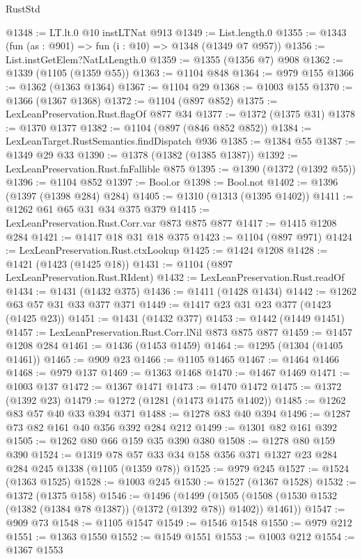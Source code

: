 \begin{lexlean}{RustStd}
\begin{coremodule}
{\begin{coremodule}
{{{{{{{{{@1348 := LT.lt.{0} @10 instLTNat @913
@1349 := List.length.{0}
@1355 := @1343 (fun (as : @901) => fun (i : @10) => @1348 (@1349 @7 @957))
@1356 := List.instGetElem?NatLtLength.{0}
@1359 := @1355 (@1356 @7) @908
@1362 := @1339 (@1105 (@1359 @55))
@1363 := @1104 @848
@1364 := @979 @155
@1366 := @1362 (@1363 @1364)
@1367 := @1104 @29
@1368 := @1003 @155
@1370 := @1366 (@1367 @1368)
@1372 := @1104 (@897 @852)
@1375 := LexLeanPreservation.Rust.flagOf @877 @34
@1377 := @1372 (@1375 @31)
@1378 := @1370 @1377
@1382 := @1104 (@897 (@846 @852 @852))
@1384 := LexLeanTarget.RustSemantics.findDispatch @936
@1385 := @1384 @55
@1387 := @1349 @29 @33
@1390 := @1378 (@1382 (@1385 @1387))
@1392 := LexLeanPreservation.Rust.fnFallible @875
@1395 := @1390 (@1372 (@1392 @55))
@1396 := @1104 @852
@1397 := Bool.or
@1398 := Bool.not
@1402 := @1396 (@1397 (@1398 @284) @284)
@1405 := @1310 (@1313 (@1395 @1402))
@1411 := @1262 @61 @65 @31 @34 @375 @379
@1415 := LexLeanPreservation.Rust.Corr.var @873 @875 @877
@1417 := @1415 @1208 @284
@1421 := @1417 @18 @31 @18 @375
@1423 := @1104 (@897 @971)
@1424 := LexLeanPreservation.Rust.ctxLookup
@1425 := @1424 @1208
@1428 := @1421 (@1423 (@1425 @18))
@1431 := @1104 (@897 LexLeanPreservation.Rust.RIdent)
@1432 := LexLeanPreservation.Rust.readOf
@1434 := @1431 (@1432 @375)
@1436 := @1411 (@1428 @1434)
@1442 := @1262 @63 @57 @31 @33 @377 @371
@1449 := @1417 @23 @31 @23 @377 (@1423 (@1425 @23))
@1451 := @1431 (@1432 @377)
@1453 := @1442 (@1449 @1451)
@1457 := LexLeanPreservation.Rust.Corr.lNil @873 @875 @877
@1459 := @1457 @1208 @284
@1461 := @1436 (@1453 @1459)
@1464 := @1295 (@1304 (@1405 @1461))
@1465 := @909 @23
@1466 := @1105 @1465
@1467 := @1464 @1466
@1468 := @979 @137
@1469 := @1363 @1468
@1470 := @1467 @1469
@1471 := @1003 @137
@1472 := @1367 @1471
@1473 := @1470 @1472
@1475 := @1372 (@1392 @23)
@1479 := @1272 (@1281 (@1473 @1475 @1402))
@1485 := @1262 @83 @57 @40 @33 @394 @371
@1488 := @1278 @83 @40 @394
@1496 := @1287 @73 @82 @161 @40 @356 @392 @284 @212
@1499 := @1301 @82 @161 @392
@1505 := @1262 @80 @66 @159 @35 @390 @380
@1508 := @1278 @80 @159 @390
@1524 := @1319 @78 @57 @33 @34 @158 @356 @371 @1327 @23 @284 @284 @245 @1338 (@1105 (@1359 @78))
@1525 := @979 @245
@1527 := @1524 (@1363 @1525)
@1528 := @1003 @245
@1530 := @1527 (@1367 @1528)
@1532 := @1372 (@1375 @158)
@1546 := @1496
    (@1499 (@1505 (@1508 (@1530 @1532 (@1382 (@1384 @78 @1387)) (@1372 (@1392 @78)) @1402)) @1461))
@1547 := @909 @73
@1548 := @1105 @1547
@1549 := @1546 @1548
@1550 := @979 @212
@1551 := @1363 @1550
@1552 := @1549 @1551
@1553 := @1003 @212
@1554 := @1367 @1553
}}}}}}}}}
\end{coremodule}}
\end{coremodule}
\end{lexlean}
